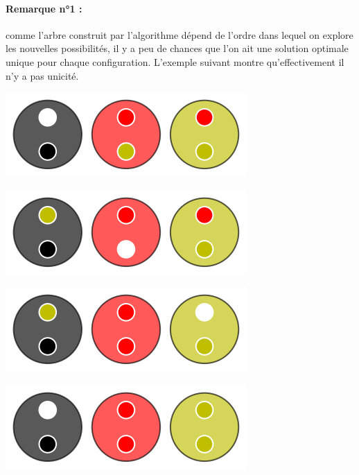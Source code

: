 \medskip

\paragraph{Remarque n°1 :} \hspace{-1em} comme l'arbre construit  par l'algorithme  dépend de l'ordre dans lequel on explore les nouvelles possibilités, il y a peu de chances que l'on ait une solution optimale unique pour chaque configuration. L'exemple suivant montre qu'effectivement il n'y a pas unicité.

\vspace{-0.4em}
\begin{multicols}{2}
	\begin{center}   %
		\includegraphics[scale=0.25]{content/optimal/tree_sol/no_unicity/sol_1/000.png}

		\includegraphics[scale=0.25]{content/optimal/tree_sol/no_unicity/sol_1/001.png}

		\includegraphics[scale=0.25]{content/optimal/tree_sol/no_unicity/sol_1/002.png}

		\includegraphics[scale=0.25]{content/optimal/tree_sol/no_unicity/sol_1/003.png}
	\end{center}


\end{multicols}
